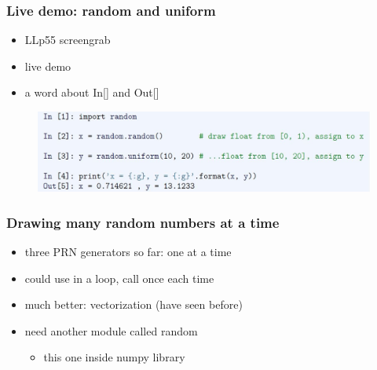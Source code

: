 \documentclass[14pt]{beamer}
\begin{document}
\begin{frame}[fragile]

\frametitle{Live demo: random and uniform}

\begin{itemize}
	\item LLp55 screengrab
	\item live demo
	\item a word about In[] and Out[]
\end{itemize}

\begin{figure}[ht]
	\centering
	\includegraphics[width=\textwidth]{figures/LLp55a}
\end{figure}

\end{frame}


\begin{frame}[fragile]

\frametitle{Drawing \textbf{many} random numbers at a time}

\begin{itemize}
	\item three PRN generators so far: one at a time
	\item could use in a loop, call once each time
	\item much better: vectorization (have seen before)
	\item need another module called random
	\begin{itemize}
		\item this one inside numpy library
	\end{itemize}
\end{itemize}

\end{frame}

\end{document}
